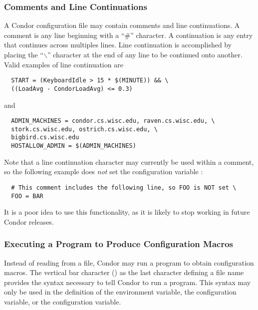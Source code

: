 \subsubsection{\label{sec:Other-Syntax}Comments and Line Continuations}

A Condor configuration file may contain comments and
line continuations.
A comment is any line beginning with a ``\#'' character.
A continuation is any entry that continues across multiples lines.
Line continuation is accomplished by placing the ``$\backslash$''
character at the end of any line to be continued onto another.
Valid examples of line continuation are
\begin{verbatim}
  START = (KeyboardIdle > 15 * $(MINUTE)) && \
  ((LoadAvg - CondorLoadAvg) <= 0.3)
\end{verbatim}
and
\begin{verbatim}
  ADMIN_MACHINES = condor.cs.wisc.edu, raven.cs.wisc.edu, \
  stork.cs.wisc.edu, ostrich.cs.wisc.edu, \
  bigbird.cs.wisc.edu
  HOSTALLOW_ADMIN = $(ADMIN_MACHINES)
\end{verbatim}

Note that a line continuation character may currently be used within
a comment, so the following example does \emph{not} set the
configuration variable :
\begin{verbatim}
  # This comment includes the following line, so FOO is NOT set \
  FOO = BAR
\end{verbatim}
It is a poor idea to use this functionality, as it is likely to
stop working in future Condor releases.

\subsubsection{\label{sec:Program-Defined-Macros}Executing a Program to Produce Configuration Macros}

Instead of reading from a file,
Condor may run a program to obtain configuration macros.
The vertical bar character (\Bar) as the last character defining
a file name provides the syntax necessary to tell 
Condor to run a program.
This syntax may only be used in the definition of
the \Env{CONDOR\_CONFIG} environment variable,
the \Macro{LOCAL\_CONFIG\_FILE} configuration variable,
or the  configuration variable.

